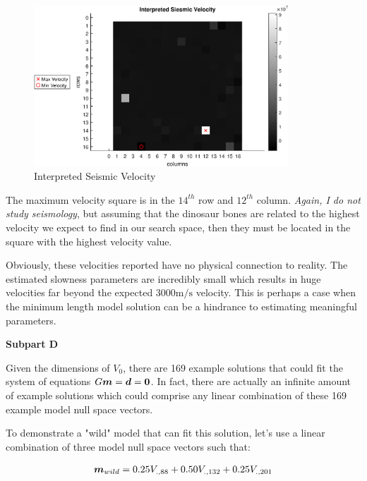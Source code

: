 \begin{figure}[h] 
	\centering
	\includegraphics[width=0.85\textwidth]{./images/prob2_partB_seismic_velocity.eps}
	\caption{Interpreted Seismic Velocity}
	\label{fig: prob2 part B seismic velocity}
\end{figure}
\FloatBarrier

The maximum velocity square is in the $14^{th}$ row and $12^{th}$ column. \textit{Again, I do not study seismology}, but assuming that the dinosaur bones are related to the highest velocity we expect to find in our search space, then they must be located in the square with the highest velocity value.

Obviously, these velocities reported have no physical connection to reality. The estimated slowness parameters are incredibly small which results in huge velocities far beyond the expected $3000 \unit{\meter\per\second}$ velocity. This is perhaps a case when the minimum length model solution can be a hindrance to estimating meaningful parameters. \newline

\textbf{Subpart D} \newline

Given the dimensions of $V_0$, there are 169 example solutions that could fit the system of equations $G\boldsymbol{m} = \boldsymbol{d} = \boldsymbol{0}$. In fact, there are actually an infinite amount of example solutions which could comprise any linear combination of these 169 example model null space vectors. 

To demonstrate a "wild" model that can fit this solution, let's use a linear combination of three model null space vectors such that:

\begin{align*}
	\boldsymbol{m}_{wild} = 0.25 V_{.,88} + 0.50 V_{.,132} + 0.25 V_{.,201}
\end{align*}

